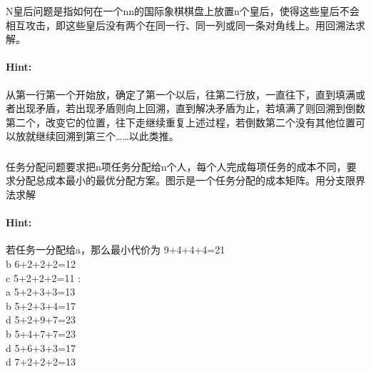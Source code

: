 \documentclass{article}
\begin{document}
     \subsubsection{} N皇后问题是指如何在一个nn的国际象棋棋盘上放置n个皇后，使得这些皇后不会相互攻击，即这些皇后没有两个在同一行、同一列或同一条对角线上。用回溯法求解。
     \paragraph{Hint:}从第一行第一个开始放，确定了第一个以后，往第二行放，一直往下，直到填满或者出现矛盾，若出现矛盾则向上回溯，直到解决矛盾为止，若填满了则回溯到倒数第二个，改变它的位置，往下走继续重复上述过程，若倒数第二个没有其他位置可以放就继续回溯到第三个……以此类推。
     
     \subsubsection{}任务分配问题要求把n项任务分配给n个人，每个人完成每项任务的成本不同，要求分配总成本最小的最优分配方案。图示是一个任务分配的成本矩阵。用分支限界法求解
     \paragraph{Hint:}若任务一分配给a，那么最小代价为
     9+4+4+4=21\\
b 6+2+2+2=12\\
c 5+2+2+2=11 :\\
\indent\indent a 5+2+3+3=13\\
\indent \indent b 5+2+3+4=17\\
\indent \indent	d 5+2+9+7=23\\
\indent	b 5+4+7+7=23\\
\indent	d 5+6+3+3=17\\
d 7+2+2+2=13\\
\end{document}
